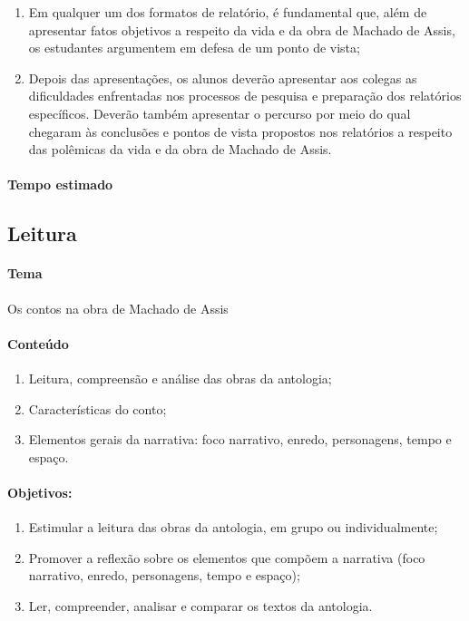 \documentclass[12pt]{extarticle}
\begin{document}
\begin{enumerate}
\item
Em qualquer um dos formatos de relatório, é fundamental que, além de
apresentar fatos objetivos a respeito da vida e da obra de Machado de
Assis, os estudantes argumentem em defesa de um ponto de vista;

\item
Depois das apresentações, os alunos deverão apresentar aos colegas as
dificuldades enfrentadas nos processos de pesquisa e preparação dos
relatórios específicos. Deverão também apresentar o percurso por meio do
qual chegaram às conclusões e pontos de vista propostos nos relatórios a
respeito das polêmicas da vida e da obra de Machado de Assis.
\end{enumerate}

\paragraph{Tempo estimado}

\subsection{Leitura}

%

\paragraph{Tema} Os contos na obra de Machado de Assis

\paragraph{Conteúdo} 
\begin{enumerate}
\item
Leitura, compreensão e análise das obras da
antologia; 
\item
Características do conto; 
\item
Elementos gerais da
narrativa: foco narrativo, enredo, personagens, tempo e espaço.
\end{enumerate}

\paragraph{Objetivos:} 
\begin{enumerate}
\item
Estimular a leitura das obras da antologia, em grupo ou individualmente; 
\item
Promover a reflexão sobre os elementos que compõem a narrativa (foco narrativo, enredo, personagens, tempo e espaço);
\item
Ler, compreender, analisar e comparar os textos da antologia.
\end{enumerate}
\end{document}

